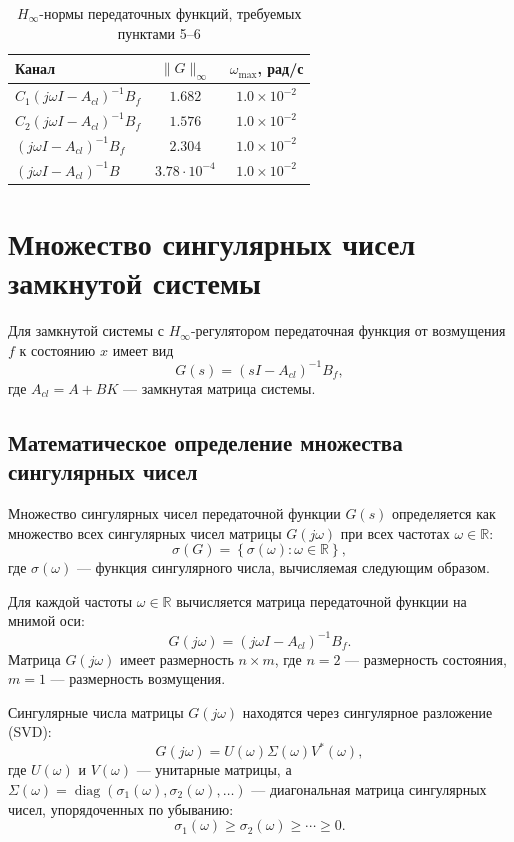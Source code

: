 \begin{table}[H]
    \centering
    \begin{tabular}{lcc}
        \toprule
        Канал & $\|G\|_{\infty}$ & $\omega_{\max}$, рад/с \\
        \midrule
        $C_1(j\omega I-A_{cl})^{-1}B_f$ & $1.682$ & $1.0\times10^{-2}$ \\
        $C_2(j\omega I-A_{cl})^{-1}B_f$ & $1.576$ & $1.0\times10^{-2}$ \\
        $(j\omega I-A_{cl})^{-1}B_f$    & $2.304$ & $1.0\times10^{-2}$ \\
        $(j\omega I-A_{cl})^{-1}B$      & $3.78\cdot10^{-4}$ & $1.0\times10^{-2}$ \\
        \bottomrule
    \end{tabular}
    \caption{$H_{\infty}$-нормы передаточных функций, требуемых пунктами 5–6}
    \label{tab:hinf-norms}
\end{table}

\section{Множество сингулярных чисел замкнутой системы}

Для замкнутой системы с $H_{\infty}$-регулятором передаточная функция от возмущения $f$ к состоянию $x$ имеет вид
\[
G(s) = (sI - A_{cl})^{-1} B_f,
\]
где $A_{cl} = A + BK$ — замкнутая матрица системы.

\subsection{Математическое определение множества сингулярных чисел}

Множество сингулярных чисел передаточной функции $G(s)$ определяется как множество всех сингулярных чисел матрицы $G(j\omega)$ при всех частотах $\omega \in \mathbb{R}$:
\[
\sigma(G) = \left\{ \sigma(\omega) : \omega \in \mathbb{R} \right\},
\]
где $\sigma(\omega)$ — функция сингулярного числа, вычисляемая следующим образом.

Для каждой частоты $\omega \in \mathbb{R}$ вычисляется матрица передаточной функции на мнимой оси:
\[
G(j\omega) = (j\omega I - A_{cl})^{-1} B_f.
\]
Матрица $G(j\omega)$ имеет размерность $n \times m$, где $n=2$ — размерность состояния, $m=1$ — размерность возмущения.

Сингулярные числа матрицы $G(j\omega)$ находятся через сингулярное разложение (SVD):
\[
G(j\omega) = U(\omega) \Sigma(\omega) V^*(\omega),
\]
где $U(\omega)$ и $V(\omega)$ — унитарные матрицы, а $\Sigma(\omega) = \operatorname{diag}(\sigma_1(\omega), \sigma_2(\omega), \ldots)$ — диагональная матрица сингулярных чисел, упорядоченных по убыванию:
\[
\sigma_1(\omega) \geq \sigma_2(\omega) \geq \cdots \geq 0.
\]

